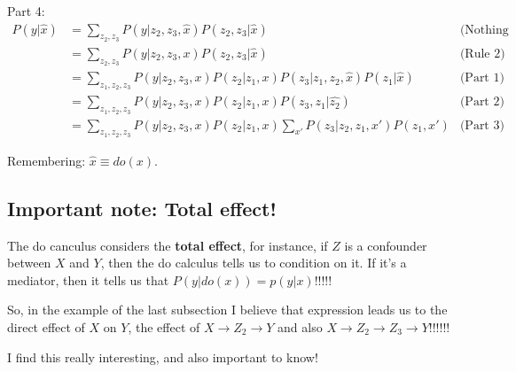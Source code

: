 Part 4:
\begin{align*}
P(y|\hat{x})&=\sum\limits_{z_2,z_3}P(y|z_2,z_3,\hat{x})P(z_2,z_3|\hat{x})&\text{(Nothing special here)}\\
&=\sum\limits_{z_2,z_3}P(y|z_2,z_3,x)P(z_2,z_3|\hat{x})&\text{(Rule 2)}\\
&=\sum\limits_{z_1,z_2,z_3}P(y|z_2,z_3,x)P(z_2|z_1,x)P(z_3|z_1,z_2,\hat{x})P(z_1|\hat{x})&\text{(Part 1)}\\
&=\sum\limits_{z_1,z_2,z_3}P(y|z_2,z_3,x)P(z_2|z_1,x)P(z_3,z_1|\hat{z_2})&\text{(Part 2)}\\
&=\sum\limits_{z_1,z_2,z_3}P(y|z_2,z_3,x)P(z_2|z_1,x)\sum\limits_{x'}P(z_3|z_2,z_1,x')P(z_1,x')&\text{(Part 3)}
\end{align*}

Remembering: $\hat{x} \equiv do(x)$.

\subsection{Important note: Total effect!}

The do canculus considers the \textbf{total effect}, for instance, if $Z$ is a confounder between $X$ and $Y$, then the do calculus tells us to condition on it. If it's a mediator, then it tells us that $P(y|do(x)) = p(y|x)$!!!!!

So, in the example of the last subsection I believe that expression leads us to the direct effect of $X$ on $Y$, the effect of $X \rightarrow Z_2 \rightarrow Y$ and also $X\rightarrow Z_2 \rightarrow Z_3 \rightarrow Y$!!!!!! 

I find this really interesting, and also important to know!
